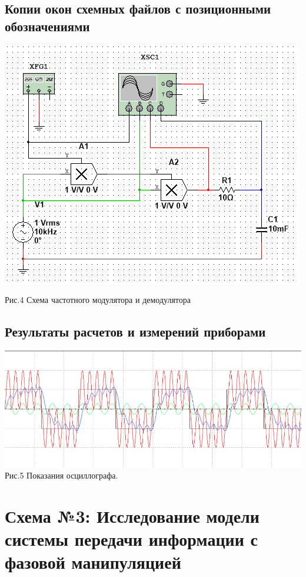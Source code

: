 \documentclass[11pt]{article}
\begin{document}
\subsection{Копии окон схемных файлов с позиционными обозначениями}
\includegraphics[width=1\linewidth]{img/scheme2.png}
\begin{center}
    Рис.4 Схема частотного модулятора и демодулятора
\end{center}

\subsection{Результаты расчетов и измерений приборами}
\begin{center}
    \includegraphics[width=1\linewidth]{img/osc2.png}
        Рис.5 Показания осциллографа.
\end{center}


\newpage
\section{Схема №3: Исследование модели системы передачи информации с фазовой манипуляцией}
\end{document}
